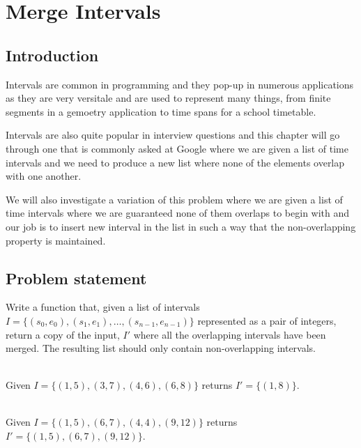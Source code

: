 %



\chapter{Merge Intervals}
\label{ch:merge_intervals_2}
\section*{Introduction}
Intervals are common in programming and they pop-up in numerous applications as they are very versitale and are used to represent many things, from finite segments in a gemoetry application to time spans for a school timetable.

Intervals are also quite popular in interview questions and this chapter will go through one that is commonly asked at Google where we are given a list of time intervals and we need to produce a new list where none of the elements overlap with one another.

We will also investigate a variation of this problem where we are given a list of time intervals where we are guaranteed none of them overlaps to begin with and our job is to insert new interval in the list in such a way that the non-overlapping property is maintained.

\section{Problem statement}
\begin{exercise}
\label{example:merge_intervals_2:exercice1_1}
Write a function that, given a list of intervals $I=\{(s_0, e_0),(s_1, e_1), \ldots,(s_{n-1}, e_{n-1})\}$ represented as a pair of integers, return a copy of the input, $I'$ where all the overlapping intervals have been merged. The resulting list should only contain non-overlapping intervals.

	\begin{example}
		\label{example:merge_intervals_2:example1_1}
		\hfill \\
		Given $I=\{(1, 5), (3, 7), (4, 6), (6, 8) \}$ returns $I'=\{(1,8)\}$.
	\end{example}

	\begin{example}
		\label{example:merge_intervals_2:example1_2}
		\hfill \\
		Given $I=\{(1, 5), (6, 7), (4, 4), (9, 12) \}$ returns $I'=\{(1,5),(6,7),(9,12)\}$.
	\end{example}
\end{exercise}


